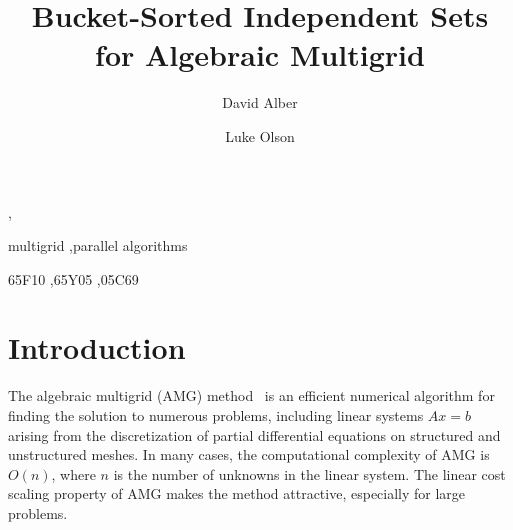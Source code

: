 \documentclass{elsart}
\begin{document}
\begin{frontmatter}


\title{Bucket-Sorted Independent Sets for Algebraic Multigrid}
\author[NREL]{David Alber},
\author[UIUC]{Luke Olson}
\address[NREL]{Scientific Computing Center\\ National Renewable Energy Laboratory}
\address[UIUC]{Department of Computer Science\\ University of Illinois at Urbana-Champaign}

\begin{abstract}
\end{abstract}

\begin{keyword}
multigrid \sep parallel algorithms

\MSC 65F10 \sep 65Y05 \sep 05C69
\end{keyword}
\end{frontmatter}

\section{Introduction}
\label{sec:intro}
The algebraic multigrid (AMG) method~\cite{Ruge1987,Brandt1982} is an
efficient numerical algorithm for finding the solution to numerous
problems, including linear systems $Ax = b$ arising from the
discretization of partial differential equations on structured and
unstructured meshes. In many cases, the computational complexity of
AMG is $O(n)$, where $n$ is the number of unknowns in the linear
system. The linear cost scaling property of AMG makes the method
attractive, especially for large problems.
\end{document}
